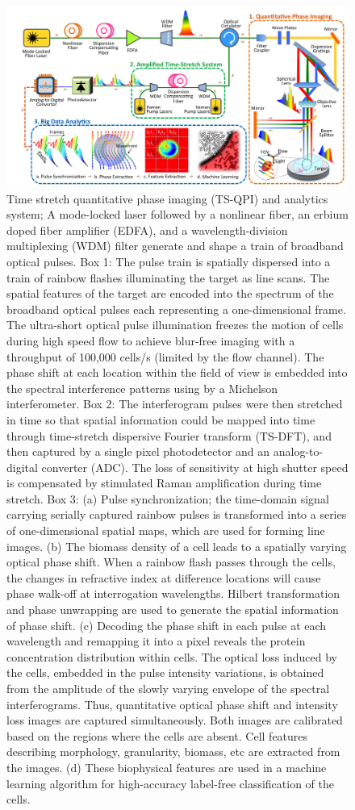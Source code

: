 \documentclass[aps,pra,reprint,longbibliography,superscriptaddress]{revtex4-1}
\begin{document}
\begin{figure}
\includegraphics[scale=0.2]{FigureSetup.jpg}
\caption{\label{fig:Setup} Time stretch quantitative phase imaging (TS-QPI) and analytics system; A mode-locked laser followed by a nonlinear fiber, an erbium doped fiber amplifier (EDFA), and a wavelength-division multiplexing (WDM) filter generate and shape a train of broadband optical pulses. Box 1: The pulse train is spatially dispersed into a train of rainbow flashes illuminating the target as line scans. The spatial features of the target are encoded into the spectrum of the broadband optical pulses each representing a one-dimensional frame. The ultra-short optical pulse illumination freezes the motion of cells during high speed flow to achieve blur-free imaging with a throughput of 100,000 cells/s (limited by the flow channel). The phase shift at each location within the field of view is embedded into the spectral interference patterns using by a Michelson interferometer. Box 2: The interferogram pulses were then stretched in time so that spatial information could be mapped into time through time-stretch dispersive Fourier transform (TS-DFT), and then captured by a single pixel photodetector and an analog-to-digital converter (ADC). The loss of sensitivity at high shutter speed is compensated by stimulated Raman amplification during time stretch. Box 3: (a) Pulse synchronization; the time-domain signal carrying serially captured rainbow pulses is transformed into a series of one-dimensional spatial maps, which are used for forming line images. (b) The biomass density of a cell leads to a spatially varying optical phase shift. When a rainbow flash passes through the cells, the changes in refractive index at difference locations will cause phase walk-off at interrogation wavelengths. Hilbert transformation and phase unwrapping are used to generate the spatial information of phase shift. (c) Decoding the phase shift in each pulse at each wavelength and remapping it into a pixel reveals the protein concentration distribution within cells. The optical loss induced by the cells, embedded in the pulse intensity variations, is obtained from the amplitude of the slowly varying envelope of the spectral interferograms. Thus, quantitative optical phase shift and intensity loss images are captured simultaneously. Both images are calibrated based on the regions where the cells are absent. Cell features describing morphology, granularity, biomass, etc are extracted from the images. (d) These biophysical features are used in a machine learning algorithm for high-accuracy label-free classification of the cells.}

\end{figure}
\end{document}
